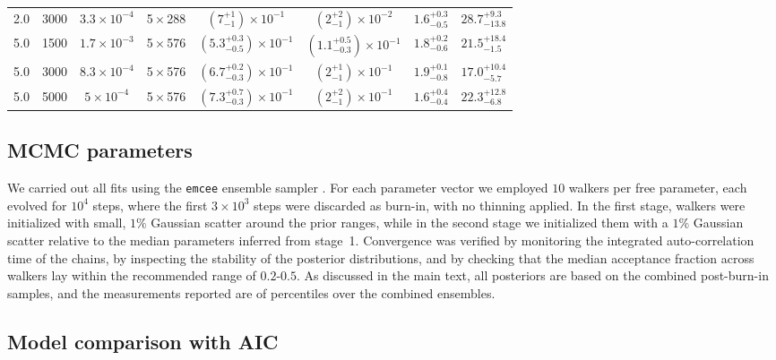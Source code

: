\documentclass[12pt,twoside]{extreport}
\providecommand{\DIFaddbegin}{} %
\providecommand{\DIFaddend}{} %
\providecommand{\DIFaddincludegraphics}[2][]{{\color{DIFgreen}\fbox{\DIFOincludegraphics[#1]{#2}}}} %
\DeclareRobustCommand{\DIFaddbegin}{\DIFOaddbegin \let\includegraphics\DIFaddincludegraphics} %
\DeclareRobustCommand{\DIFaddend}{\DIFOaddend \let\includegraphics\DIFOincludegraphics} %
\begin{document}
\begin{table}
{{\begin{tabular}{
    c c c c
    c c c c
}
2.0 & 3000 & $3.3\times 10^{-4}$ & 5\,$\times$\,288 & $\left(7_{-1}^{+1}\right)\times 10^{-1}$ & $\left(2_{-1}^{+2}\right)\times 10^{-2}$ & $1.6_{-0.5}^{+0.3}$ & $28.7_{-13.8}^{+9.3}$ \\

5.0 & 1500 & $1.7\times 10^{-3}$ & 5\,$\times$\,576 & $\left(5.3_{-0.5}^{+0.3}\right)\times 10^{-1}$ & $\left(1.1_{-0.3}^{+0.5}\right)\times 10^{-1}$ & $1.8_{-0.6}^{+0.2}$ & $21.5_{-1.5}^{+18.4}$ \\

5.0 & 3000 & $8.3\times 10^{-4}$ & 5\,$\times$\,576 & $\left(6.7_{-0.3}^{+0.2}\right)\times 10^{-1}$ & $\left(2_{-1}^{+1}\right)\times 10^{-1}$ & $1.9_{-0.8}^{+0.1}$ & $17.0_{-5.7}^{+10.4}$ \\

5.0 & 5000 & $5\times 10^{-4}$ & 5\,$\times$\,576 & $\left(7.3_{-0.3}^{+0.7}\right)\times 10^{-1}$ & $\left(2_{-1}^{+2}\right)\times 10^{-1}$ & $1.6_{-0.4}^{+0.4}$ & $22.3_{-6.8}^{+12.8}$ \\
\hline
\hline
\end{tabular}
}%
}
\end{table}


\subsection{MCMC parameters}
\DIFaddbegin \label{app:ssd-nl:mcmc}
\DIFaddend

    We carried out all fits using the \texttt{emcee} ensemble sampler \citep{Foreman-Mackey13a}. For each parameter vector we employed $10$ walkers per free parameter, each evolved for $10^4$ steps, where the first $3\times 10^3$ steps were discarded as burn-in, with no thinning applied. In the first stage, walkers were initialized with small, $1\%$ Gaussian scatter around the prior ranges, while in the second stage we initialized them with a $1\%$ Gaussian scatter relative to the median parameters inferred from stage~1. Convergence was verified by monitoring the integrated auto-correlation time of the chains, by inspecting the stability of the posterior distributions, and by checking that the median acceptance fraction across walkers lay within the recommended range of $0.2$-$0.5$. As discussed in the main text, all posteriors are based on the combined post-burn-in samples, and the measurements reported are of percentiles over the combined ensembles.

\subsection{Model comparison with AIC}
\DIFaddbegin \label{app:ssd-nl:aic}
\DIFaddend
\end{document}
